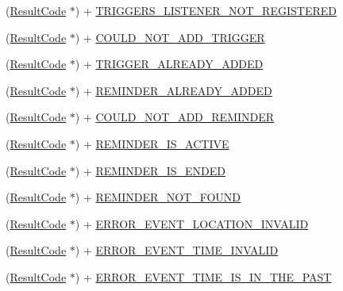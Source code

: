 \begin{DoxyCompactItemize}
\item 
(\hyperlink{interface_result_code}{Result\+Code} $\ast$) + \hyperlink{interface_result_code_aa9a94b759bf0465ad5f9a269562f3555}{T\+R\+I\+G\+G\+E\+R\+S\+\_\+\+L\+I\+S\+T\+E\+N\+E\+R\+\_\+\+N\+O\+T\+\_\+\+R\+E\+G\+I\+S\+T\+E\+R\+E\+D}
\item 
(\hyperlink{interface_result_code}{Result\+Code} $\ast$) + \hyperlink{interface_result_code_aa59f0b5ae7567df30b78536890c0f21a}{C\+O\+U\+L\+D\+\_\+\+N\+O\+T\+\_\+\+A\+D\+D\+\_\+\+T\+R\+I\+G\+G\+E\+R}
\item 
(\hyperlink{interface_result_code}{Result\+Code} $\ast$) + \hyperlink{interface_result_code_ac47f742a846c02d12c0cd7e92e5555c5}{T\+R\+I\+G\+G\+E\+R\+\_\+\+A\+L\+R\+E\+A\+D\+Y\+\_\+\+A\+D\+D\+E\+D}
\item 
(\hyperlink{interface_result_code}{Result\+Code} $\ast$) + \hyperlink{interface_result_code_a223505fb2838e371bca98a1003b5bfcd}{R\+E\+M\+I\+N\+D\+E\+R\+\_\+\+A\+L\+R\+E\+A\+D\+Y\+\_\+\+A\+D\+D\+E\+D}
\item 
(\hyperlink{interface_result_code}{Result\+Code} $\ast$) + \hyperlink{interface_result_code_a7c10e601d0ad6f4e3ad0ded3751f0100}{C\+O\+U\+L\+D\+\_\+\+N\+O\+T\+\_\+\+A\+D\+D\+\_\+\+R\+E\+M\+I\+N\+D\+E\+R}
\item 
(\hyperlink{interface_result_code}{Result\+Code} $\ast$) + \hyperlink{interface_result_code_ac8d69f9d96dfc01a6c21980bc9d60659}{R\+E\+M\+I\+N\+D\+E\+R\+\_\+\+I\+S\+\_\+\+A\+C\+T\+I\+V\+E}
\item 
(\hyperlink{interface_result_code}{Result\+Code} $\ast$) + \hyperlink{interface_result_code_a4736e893be6c8e5e4f1c548b16c9fe5c}{R\+E\+M\+I\+N\+D\+E\+R\+\_\+\+I\+S\+\_\+\+E\+N\+D\+E\+D}
\item 
(\hyperlink{interface_result_code}{Result\+Code} $\ast$) + \hyperlink{interface_result_code_a34a397c0d448c071c74a46bff993cc30}{R\+E\+M\+I\+N\+D\+E\+R\+\_\+\+N\+O\+T\+\_\+\+F\+O\+U\+N\+D}
\item 
(\hyperlink{interface_result_code}{Result\+Code} $\ast$) + \hyperlink{interface_result_code_ae763e44d5cf983bff098c3419b24ef42}{E\+R\+R\+O\+R\+\_\+\+E\+V\+E\+N\+T\+\_\+\+L\+O\+C\+A\+T\+I\+O\+N\+\_\+\+I\+N\+V\+A\+L\+I\+D}
\item 
(\hyperlink{interface_result_code}{Result\+Code} $\ast$) + \hyperlink{interface_result_code_a149d639e8d59e8f65b72800d1e5ed5ad}{E\+R\+R\+O\+R\+\_\+\+E\+V\+E\+N\+T\+\_\+\+T\+I\+M\+E\+\_\+\+I\+N\+V\+A\+L\+I\+D}
\item 
(\hyperlink{interface_result_code}{Result\+Code} $\ast$) + \hyperlink{interface_result_code_a3a64dc658e511e3bd571239f3b91a62e}{E\+R\+R\+O\+R\+\_\+\+E\+V\+E\+N\+T\+\_\+\+T\+I\+M\+E\+\_\+\+I\+S\+\_\+\+I\+N\+\_\+\+T\+H\+E\+\_\+\+P\+A\+S\+T}

\end{DoxyCompactItemize}
